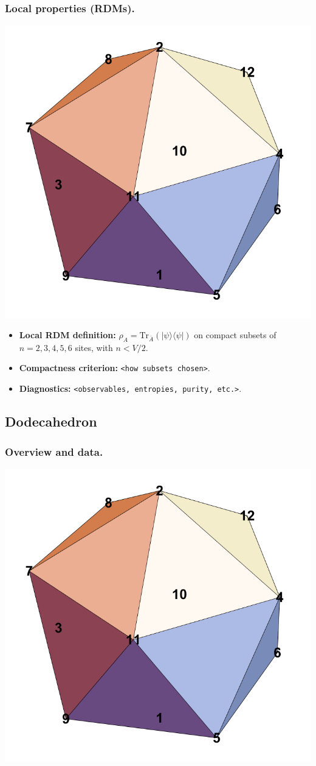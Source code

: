 \documentclass[11pt,a4paper]{article}
\begin{document}
\subsubsection*{Local properties (RDMs).}
\begin{center}
  \includegraphics[width=.6\linewidth]{icosahedron}
\end{center}

\begin{itemize}[leftmargin=1.5em]
  \item \textbf{Local RDM definition:} $\rho_A=\mathrm{Tr}_{\bar A}(|\psi\rangle\langle\psi|)$ on compact subsets of $n=2,3,4,5,6$ sites, with $n < V/2$.
  \item \textbf{Compactness criterion:} \texttt{<how subsets chosen>}.
  \item \textbf{Diagnostics:} \texttt{<observables, entropies, purity, etc.>}.
\end{itemize}


\subsection*{Dodecahedron}

\subsubsection*{Overview and data.}
\begin{center}
  \includegraphics[width=.6\linewidth]{icosahedron}
\end{center}
\end{document}
